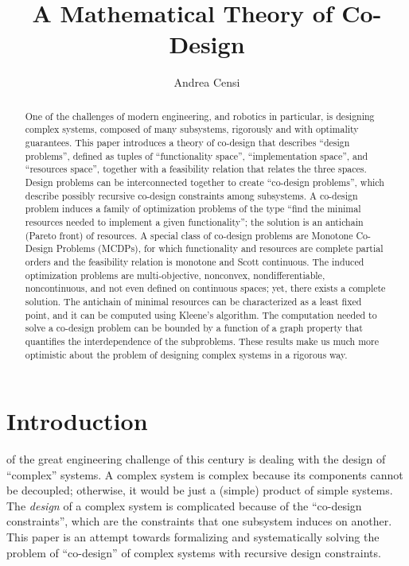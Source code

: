 \firstpage


\title{\vspace{-5mm}\huge A Mathematical Theory of Co-Design}

\author{Andrea Censi\mythanks}
\maketitle
\begin{abstract}
One of the challenges of modern engineering, and robotics in particular,
is designing complex systems, composed of many subsystems, rigorously
and with optimality guarantees. This paper introduces a theory of
co-design that describes ``design problems'', defined as tuples
of ``functionality space'', ``implementation space'', and ``resources
space'', together with a feasibility relation that relates the three
spaces. Design problems can be interconnected together to create ``co-design
problems'', which describe possibly recursive co-design constraints
among subsystems. A co-design problem induces a family of optimization
problems of the type ``find the minimal resources needed to implement
a given functionality''; the solution is an antichain (Pareto front)
of resources. A special class of co-design problems are Monotone Co-Design
Problems (MCDPs), for which functionality and resources are complete
partial orders and the feasibility relation is monotone and Scott
continuous. The induced optimization problems are multi-objective,
nonconvex, nondifferentiable, noncontinuous, and not even defined
on continuous spaces; yet, there exists a complete solution. The antichain
of minimal resources can be characterized as a least fixed point,
and it can be computed using Kleene's algorithm. The computation needed
to solve a co-design problem can be bounded by a function of a graph
property that quantifies the interdependence of the subproblems. These
results make us much more optimistic about the problem of designing
complex systems in a rigorous way.  
\end{abstract}





\section{Introduction}

 of the great engineering challenge of this
century is dealing with the design of ``complex'' systems. A complex
system is complex because its components cannot be decoupled; otherwise,
it would be just a (simple) product of simple systems. The \emph{design}
of a complex system is complicated because of the ``co-design constraints'',
which are the constraints that one subsystem induces on another. This
paper is an attempt towards formalizing and systematically solving
the problem of ``co-design'' of complex systems with recursive design
constraints.

